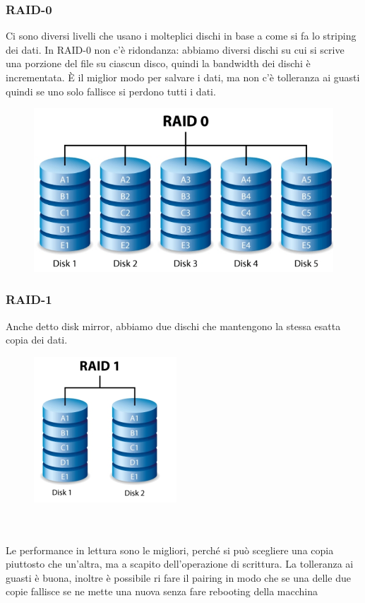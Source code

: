 \documentclass[12pt, oneside]{extbook} %
\begin{document}
\subsubsection{RAID-0}
Ci sono diversi livelli che usano i molteplici dischi in base a come si fa lo striping dei dati. In RAID-0 non c'è ridondanza: abbiamo diversi dischi su cui si scrive una porzione del file su ciascun disco, quindi la bandwidth dei dischi è incrementata. È il miglior modo per salvare i dati, ma non c'è tolleranza ai guasti quindi se uno solo fallisce si perdono tutti i dati.\\
\begin{figure}[!h]
	\includegraphics[scale=0.4]{immagini/raid0.png}
\end{figure}
\subsubsection{RAID-1}
Anche detto disk mirror, abbiamo due dischi che mantengono la stessa esatta copia dei dati.\\
\begin{figure}[!h]
	\includegraphics[scale=0.4]{immagini/raid1.png}
\end{figure}\\\\
Le performance in lettura sono le migliori, perché si può scegliere una copia piuttosto che un'altra, ma a scapito dell'operazione di scrittura. La tolleranza ai guasti è buona, inoltre è possibile ri fare il pairing in modo che se una delle due copie fallisce se ne mette una nuova senza fare rebooting della macchina
\end{document}
